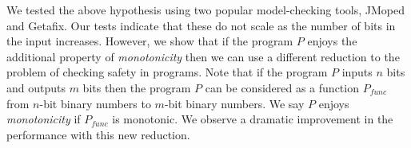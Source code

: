 We tested the above  hypothesis using two popular model-checking tools, JMoped and Getafix. Our tests indicate that these   do not scale as  the number of bits
in the input increases.  However, we show that if the program $P$ enjoys the additional property of \emph{monotonicity} then we can use a different reduction to the  problem of checking safety in  programs.  Note that if the program $P$ inputs $n$ bits and outputs $m$ bits then the program $P$ can be considered as  a function $P_{func}$ from $n$-bit binary numbers to $m$-bit binary numbers.    We say $P$ enjoys   
\emph{monotonicity}  if $P_{func}$ is monotonic. %
We observe a dramatic improvement in the performance with this new reduction.

\fi

  